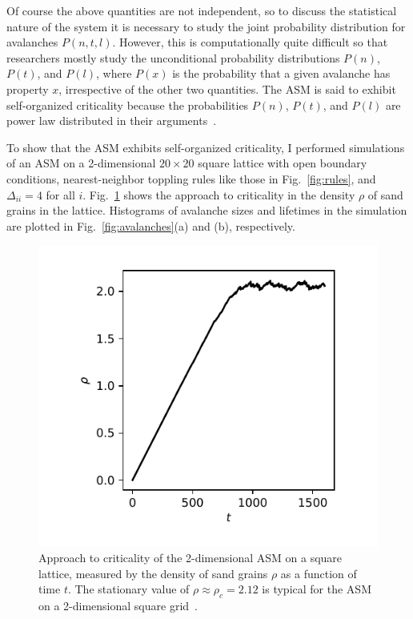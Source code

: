 \documentclass[aps,prb,reprint,superscriptaddress]{revtex4-2}
\begin{document}
Of course the above quantities are not independent, so to discuss the statistical nature of the system it is necessary to study the joint probability distribution for avalanches $P(n, t, l)$. However, this is computationally quite difficult so that researchers mostly study the unconditional probability distributions $P(n)$, $P(t)$, and $P(l)$, where $P(x)$ is the probability that a given avalanche has property $x$, irrespective of the other two quantities. The ASM is said to exhibit self-organized criticality because the probabilities $P(n)$, $P(t)$, and $P(l)$ are power law distributed in their arguments~\cite{jensen}.

To show that the ASM exhibits self-organized criticality, I performed simulations of an ASM on a 2-dimensional $20 \times 20$ square lattice with open boundary conditions, nearest-neighbor toppling rules like those in Fig.~\ref{fig:rules}, and $\Delta_{ii} = 4$ for all $i$. Fig.~\ref{fig:density} shows the approach to criticality in the density $\rho$ of sand grains in the lattice. Histograms of avalanche sizes and lifetimes in the simulation are plotted in Fig.~\ref{fig:avalanches}(a) and (b), respectively.

\begin{figure}
\includegraphics{density}
\caption{\label{fig:density} Approach to criticality of the 2-dimensional ASM on a square lattice, measured by the density of sand grains $\rho$ as a function of time $t$. The stationary value of $\rho \approx \rho_c = 2.12$ is typical for the ASM on a 2-dimensional square grid~\cite{jensen}.}
\end{figure}
\end{document}
